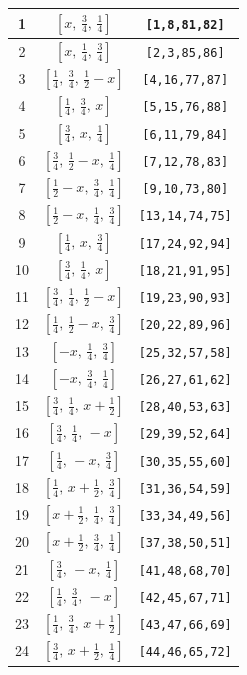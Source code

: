 \documentclass[fleqn,8pt]{jsarticle}
\begin{document}
\begin{longtable}{ccc}
1 & $\left[ x,\, \frac{3}{4},\, \frac{1}{4} \right]$ & {\tt [1,8,81,82]} \\ \hline
2 & $\left[ x,\, \frac{1}{4},\, \frac{3}{4} \right]$ & {\tt [2,3,85,86]} \\ \hline
3 & $\left[ \frac{1}{4},\, \frac{3}{4},\, \frac{1}{2} - x \right]$ & {\tt [4,16,77,87]} \\ \hline
4 & $\left[ \frac{1}{4},\, \frac{3}{4},\, x \right]$ & {\tt [5,15,76,88]} \\ \hline
5 & $\left[ \frac{3}{4},\, x,\, \frac{1}{4} \right]$ & {\tt [6,11,79,84]} \\ \hline
6 & $\left[ \frac{3}{4},\, \frac{1}{2} - x,\, \frac{1}{4} \right]$ & {\tt [7,12,78,83]} \\ \hline
7 & $\left[ \frac{1}{2} - x,\, \frac{3}{4},\, \frac{1}{4} \right]$ & {\tt [9,10,73,80]} \\ \hline
8 & $\left[ \frac{1}{2} - x,\, \frac{1}{4},\, \frac{3}{4} \right]$ & {\tt [13,14,74,75]} \\ \hline
9 & $\left[ \frac{1}{4},\, x,\, \frac{3}{4} \right]$ & {\tt [17,24,92,94]} \\ \hline
10 & $\left[ \frac{3}{4},\, \frac{1}{4},\, x \right]$ & {\tt [18,21,91,95]} \\ \hline
11 & $\left[ \frac{3}{4},\, \frac{1}{4},\, \frac{1}{2} - x \right]$ & {\tt [19,23,90,93]} \\ \hline
12 & $\left[ \frac{1}{4},\, \frac{1}{2} - x,\, \frac{3}{4} \right]$ & {\tt [20,22,89,96]} \\ \hline
13 & $\left[ - x,\, \frac{1}{4},\, \frac{3}{4} \right]$ & {\tt [25,32,57,58]} \\ \hline
14 & $\left[ - x,\, \frac{3}{4},\, \frac{1}{4} \right]$ & {\tt [26,27,61,62]} \\ \hline
15 & $\left[ \frac{3}{4},\, \frac{1}{4},\, x + \frac{1}{2} \right]$ & {\tt [28,40,53,63]} \\ \hline
16 & $\left[ \frac{3}{4},\, \frac{1}{4},\, - x \right]$ & {\tt [29,39,52,64]} \\ \hline
17 & $\left[ \frac{1}{4},\, - x,\, \frac{3}{4} \right]$ & {\tt [30,35,55,60]} \\ \hline
18 & $\left[ \frac{1}{4},\, x + \frac{1}{2},\, \frac{3}{4} \right]$ & {\tt [31,36,54,59]} \\ \hline
19 & $\left[ x + \frac{1}{2},\, \frac{1}{4},\, \frac{3}{4} \right]$ & {\tt [33,34,49,56]} \\ \hline
20 & $\left[ x + \frac{1}{2},\, \frac{3}{4},\, \frac{1}{4} \right]$ & {\tt [37,38,50,51]} \\ \hline
21 & $\left[ \frac{3}{4},\, - x,\, \frac{1}{4} \right]$ & {\tt [41,48,68,70]} \\ \hline
22 & $\left[ \frac{1}{4},\, \frac{3}{4},\, - x \right]$ & {\tt [42,45,67,71]} \\ \hline
23 & $\left[ \frac{1}{4},\, \frac{3}{4},\, x + \frac{1}{2} \right]$ & {\tt [43,47,66,69]} \\ \hline
24 & $\left[ \frac{3}{4},\, x + \frac{1}{2},\, \frac{1}{4} \right]$ & {\tt [44,46,65,72]} \\
\end{longtable}
\end{document}
